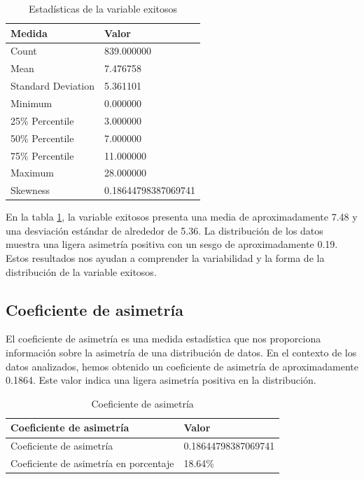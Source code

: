 \begin{table}[htbp]
    \centering
    \caption{Estadísticas de la variable exitosos}
    \begin{tabular}{ll}
        \hline
        \textbf{Medida}    & \textbf{Valor}      \\
        \hline
        Count              & 839.000000          \\
        Mean               & 7.476758            \\
        Standard Deviation & 5.361101            \\
        Minimum            & 0.000000            \\
        25\% Percentile    & 3.000000            \\
        50\% Percentile    & 7.000000            \\
        75\% Percentile    & 11.000000           \\
        Maximum            & 28.000000           \\
        Skewness           & 0.18644798387069741 \\
        \hline
    \end{tabular}%
    \label{tab:estadistica_variable_exito}%
\end{table}%

En la tabla \ref{tab:estadistica_variable_exito}, la variable exitosos presenta una media de aproximadamente 7.48 y una desviación estándar de alrededor de 5.36.
La distribución de los datos muestra una ligera asimetría positiva con un sesgo de aproximadamente 0.19.
Estos resultados nos ayudan a comprender la variabilidad y la forma de la distribución de la variable exitosos.

\subsection{Coeficiente de asimetría}

El coeficiente de asimetría es una medida estadística que nos proporciona información sobre la asimetría de
una distribución de datos. En el contexto de los datos analizados, hemos obtenido un coeficiente de asimetría
de aproximadamente 0.1864. Este valor indica una ligera asimetría positiva en la distribución.

\begin{table}[htbp]
    \centering
    \caption{Coeficiente de asimetría}
    \begin{tabular}{ll}
        \hline
        \textbf{Coeficiente de asimetría}      & \textbf{Valor}      \\
        \hline
        Coeficiente de asimetría               & 0.18644798387069741 \\
        Coeficiente de asimetría en porcentaje & 18.64\%             \\
        \hline
    \end{tabular}%
    \label{tab:skewness}%
\end{table}%

